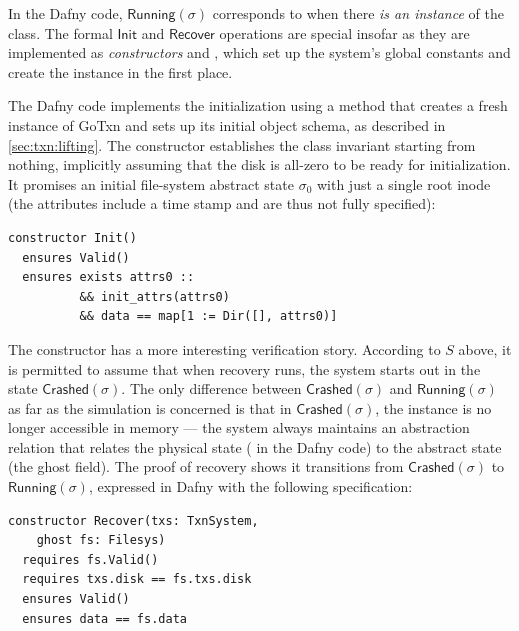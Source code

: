 In the Dafny code, $\mathsf{Running}(\sigma)$ corresponds to when there \emph{is
an instance} of the  class. The formal $\mathsf{Init}$ and
$\mathsf{Recover}$ operations are special insofar as they are implemented as
\emph{constructors}  and , which set up the system's global
constants and create the instance in the first place.

The Dafny code implements the initialization using a  method
that creates a fresh instance of GoTxn and sets up its initial object schema, as
described in \cref{sec:txn:lifting}. The  constructor establishes the
class invariant  starting from nothing, implicitly assuming that the
disk is all-zero to be ready for initialization. It promises an initial
file-system abstract state $\sigma_{0}$ with just a single root inode (the
attributes include a time stamp and are thus not fully specified):

\begin{verbatim}
constructor Init()
  ensures Valid()
  ensures exists attrs0 ::
          && init_attrs(attrs0)
          && data == map[1 := Dir([], attrs0)]
\end{verbatim}

The  constructor has a more interesting verification story.
According to $S$ above,
it is permitted to assume that when recovery runs, the system starts out in the state
$\mathsf{Crashed}(\sigma)$. The only difference between
$\mathsf{Crashed}(\sigma)$ and $\mathsf{Running}(\sigma)$ as far as the
simulation is concerned is that in $\mathsf{Crashed}(\sigma)$, the 
instance is no longer accessible in memory --- the system always maintains an
abstraction relation  that relates the physical state
( in the Dafny code) to the abstract state (the  ghost
field). The proof of recovery shows it transitions from
$\mathsf{Crashed}(\sigma)$ to $\mathsf{Running}(\sigma)$, expressed in Dafny
with the following specification:

\begin{verbatim}
constructor Recover(txs: TxnSystem,
    ghost fs: Filesys)
  requires fs.Valid()
  requires txs.disk == fs.txs.disk
  ensures Valid()
  ensures data == fs.data
\end{verbatim}

